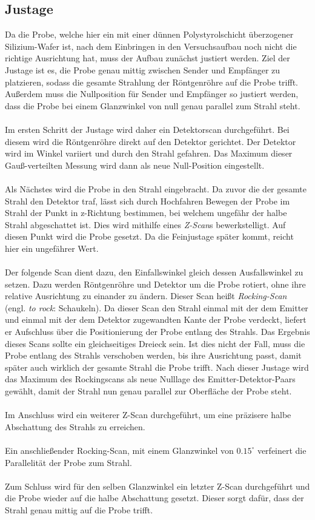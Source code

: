 \subsection{Justage}
Da die Probe, welche hier ein mit einer dünnen Polystyrolschicht überzogener Silizium-Wafer ist, nach dem Einbringen in den Versuchsaufbau noch nicht die richtige Ausrichtung hat, muss der Aufbau zunächst justiert werden. Ziel der Justage ist es, die Probe genau mittig zwischen Sender und Empfänger zu platzieren, sodass die gesamte Strahlung der Röntgenröhre auf die Probe trifft. Außerdem muss die Nullposition für Sender und Empfänger so justiert werden, dass die Probe bei einem Glanzwinkel von null genau parallel zum Strahl steht.\\
\\
Im ersten Schritt der Justage wird daher ein Detektorscan durchgeführt. Bei diesem wird die Röntgenröhre direkt auf den Detektor gerichtet. Der Detektor wird im Winkel variiert und durch den Strahl gefahren. Das Maximum dieser Gauß-verteilten Messung wird dann als neue Null-Position eingestellt.\\
\\
Als Nächstes wird die Probe in den Strahl eingebracht. Da zuvor die der gesamte Strahl den Detektor traf, lässt sich durch Hochfahren Bewegen der Probe im Strahl der Punkt in z-Richtung bestimmen, bei welchem ungefähr der halbe Strahl abgeschattet ist. Dies wird mithilfe eines \textit{Z-Scan}s bewerkstelligt. Auf diesen Punkt wird die Probe gesetzt. Da die Feinjustage später kommt, reicht hier ein ungefährer Wert.\\
\\
Der folgende Scan dient dazu, den Einfallswinkel gleich dessen Ausfallswinkel zu setzen. Dazu werden Röntgenröhre und Detektor um die Probe rotiert, ohne ihre relative Ausrichtung zu einander zu ändern. Dieser Scan heißt \textit{Rocking-Scan} (engl. \textit{to rock}: Schaukeln). Da dieser Scan den Strahl einmal mit der dem Emitter und einmal mit der dem Detektor zugewandten Kante der Probe verdeckt, liefert er Aufschluss über die Positionierung der Probe entlang des Strahls. Das Ergebnis dieses Scans sollte ein gleichseitiges Dreieck sein. Ist dies nicht der Fall, muss die Probe entlang des Strahls verschoben werden, bis ihre Ausrichtung passt, damit später auch wirklich der gesamte Strahl die Probe trifft. Nach dieser Justage wird das Maximum des Rockingscans als neue Nulllage des Emitter-Detektor-Paars gewählt, damit der Strahl nun genau parallel zur Oberfläche der Probe steht.\\
\\
Im Anschluss wird ein weiterer Z-Scan durchgeführt, um eine präzisere halbe Abschattung des Strahls zu erreichen.\\
\\
Ein anschließender Rocking-Scan, mit einem Glanzwinkel von $0.15^\circ$ verfeinert die Parallelität der Probe zum Strahl.\\
\\
Zum Schluss wird für den selben Glanzwinkel ein letzter Z-Scan durchgeführt und die Probe wieder auf die halbe Abschattung gesetzt. Dieser sorgt dafür, dass der Strahl genau mittig auf die Probe trifft.

